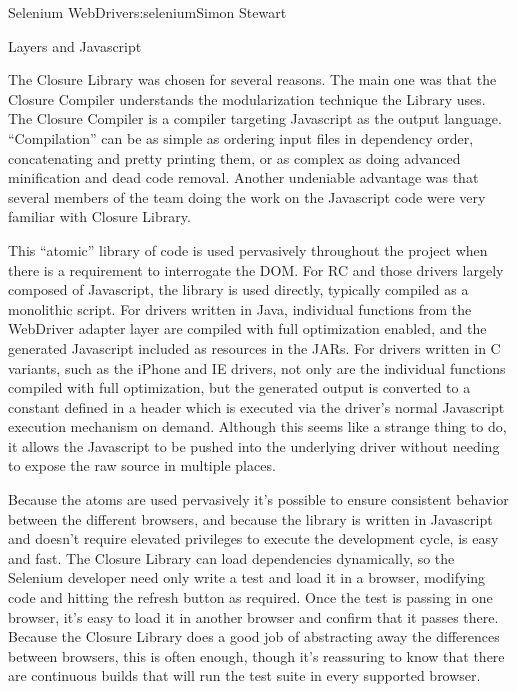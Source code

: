 \begin{aosachapter}{Selenium WebDriver}{s:selenium}{Simon Stewart}
\begin{aosasect1}{Layers and Javascript}

The Closure Library was chosen for several reasons. The main one was
that the Closure Compiler understands the modularization technique the
Library uses. The Closure Compiler is a compiler targeting Javascript
as the output language. ``Compilation'' can be as simple as ordering
input files in dependency order, concatenating and pretty printing
them, or as complex as doing advanced minification and dead code
removal. Another undeniable advantage was that several members of the
team doing the work on the Javascript code were very familiar with
Closure Library.

This ``atomic'' library of code is used pervasively throughout the
project when there is a requirement to interrogate the DOM\@.  For RC
and those drivers largely composed of Javascript, the library is used
directly, typically compiled as a monolithic script. For drivers
written in Java, individual functions from the WebDriver adapter layer
are compiled with full optimization enabled, and the generated
Javascript included as resources in the JARs. For drivers written in C
variants, such as the iPhone and IE drivers, not only are the
individual functions compiled with full optimization, but the
generated output is converted to a constant defined in a header which
is executed via the driver's normal Javascript execution mechanism on
demand. Although this seems like a strange thing to do, it allows the
Javascript to be pushed into the underlying driver without needing to
expose the raw source in multiple places.

Because the atoms are used pervasively it's possible to ensure
consistent behavior between the different browsers, and because the
library is written in Javascript and doesn't require elevated
privileges to execute the development cycle, is easy and fast. The
Closure Library can load dependencies dynamically, so the Selenium
developer need only write a test and load it in a browser, modifying
code and hitting the refresh button as required. Once the test is
passing in one browser, it's easy to load it in another browser and
confirm that it passes there. Because the Closure Library does a good
job of abstracting away the differences between browsers, this is
often enough, though it's reassuring to know that there are continuous
builds that will run the test suite in every supported browser.


\end{aosasect1}
\end{aosachapter}
